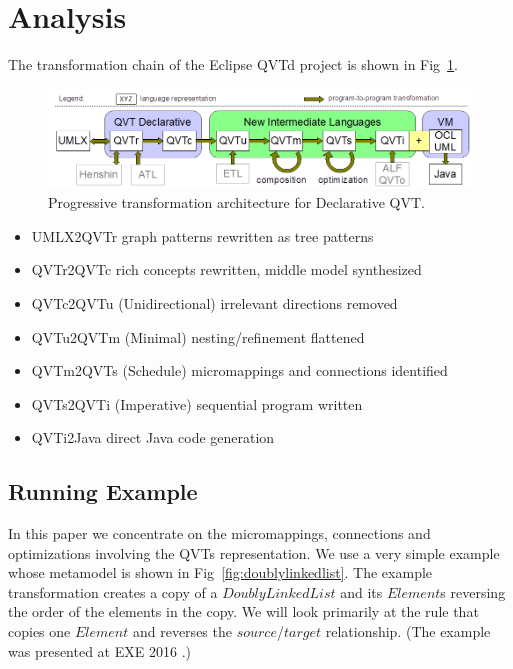\documentclass{llncs}
\begin{document}
\section{Analysis}\label{Analysis}

The transformation chain of the Eclipse QVTd project is shown in Fig~\ref{fig:architecture}.

\begin{figure}[h]
	\centering
	\includegraphics[width=1.0\textwidth]{QVThorizontalAlphabet.png}
	\caption{Progressive transformation architecture for Declarative QVT.}
	\label{fig:architecture}
\end{figure}

\begin{itemize}
	\item UMLX2QVTr graph patterns rewritten as tree patterns
	\item QVTr2QVTc rich concepts rewritten, middle model synthesized
	\item QVTc2QVTu (Unidirectional) irrelevant directions removed
	\item QVTu2QVTm (Minimal) nesting/refinement flattened
	\item QVTm2QVTs (Schedule) micromappings and connections identified
	\item QVTs2QVTi (Imperative) sequential program written
	\item QVTi2Java direct Java code generation
\end{itemize} 

\subsection{Running Example}

In this paper we concentrate on the micromappings, connections and optimizations involving the QVTs representation. We use a very simple example whose metamodel is shown in Fig~\ref{fig:doublylinkedlist}. The example transformation creates a copy of a $DoublyLinkedList$ and its $Element$s reversing the order of the elements in the copy. We will look primarily at the rule that copies one $Element$ and reverses the $source$/$target$ relationship. (The example was presented at EXE 2016 \cite{Willink-EXE2016}.)
\end{document}
